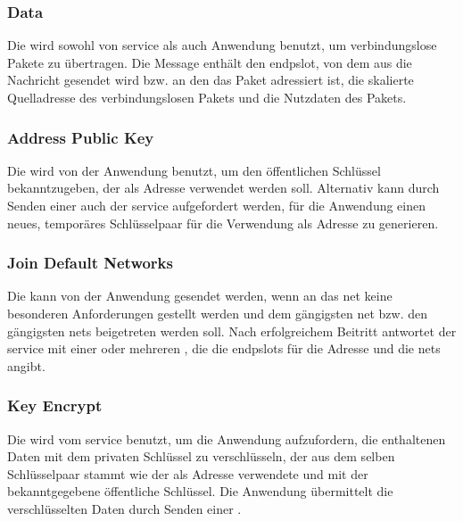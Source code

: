 \asprotoslotassignbytefield


\subsubsection{Data}
\label{dcl-asproto-data}
Die \msg{\asprotodata} wird sowohl von \gls{service} als auch Anwendung benutzt,
um verbindungslose Pakete zu übertragen.
Die Message enthält den \gls{endpslot}, von dem aus die Nachricht gesendet wird
bzw. an den das Paket adressiert ist, die skalierte Quelladresse des
verbindungslosen Pakets und die Nutzdaten des Pakets.

\asprotodatabytefield


\subsubsection{Address Public Key}
\label{dcl-asproto-addrpubkey}
Die \msg{\asprotoaddrpubkey} wird von der Anwendung benutzt, um den öffentlichen
Schlüssel bekanntzugeben, der als Adresse verwendet werden soll.
Alternativ kann durch Senden einer \msg{\asprotogenkey} auch der \gls{service}
aufgefordert werden, für die Anwendung einen neues, temporäres Schlüsselpaar
für die Verwendung als Adresse zu generieren.

\asprotoaddrpubkeybytefield


\subsubsection{Join Default Networks}
\label{dcl-asproto-joindefnets}
Die \msg{\asprotojoindefnets} kann von der Anwendung gesendet werden, wenn
an das \gls{net} keine besonderen Anforderungen gestellt werden und dem
gängigsten \gls{net} bzw. den gängigsten \glspl{net} beigetreten werden soll.
Nach erfolgreichem Beitritt antwortet der \gls{service} mit einer oder mehreren
\msgpl{\asprotoslotassign}, die die \glspl{endpslot} für die Adresse und die
\glspl{net} angibt.

\asprotojoindefnetsbytefield


\subsubsection{Key Encrypt}
\label{dcl-asproto-keyenc}
Die \msg{\asprotokeyenc} wird vom \gls{service} benutzt, um die Anwendung
aufzufordern, die enthaltenen Daten mit dem privaten Schlüssel zu verschlüsseln,
der aus dem selben Schlüsselpaar stammt wie der als Adresse verwendete und mit
der \msg{\asprotoaddrpubkey} bekanntgegebene öffentliche Schlüssel.
Die Anwendung übermittelt die verschlüsselten Daten durch Senden einer
\msg{\asprotocryptoresponse}.

